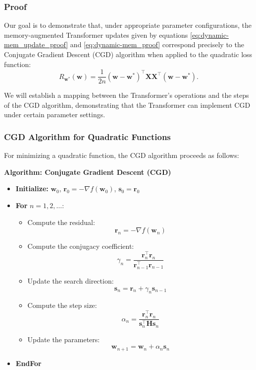 \documentclass[11pt]{article}
\theoremstyle{plain}
\theoremstyle{definition}
\theoremstyle{remark}
\numberwithin{equation}{section}
\begin{document}
\subsubsection*{Proof}
Our goal is to demonstrate that, under appropriate parameter configurations, the memory-augmented Transformer updates given by equations \eqref{eq:dynamic-mem_update_proof} and \eqref{eq:dynamic-mem_proof} correspond precisely to the Conjugate Gradient Descent (CGD) algorithm when applied to the quadratic loss function:
\begin{equation}
    R_{\mathbf{w}^*}(\mathbf{w}) = \frac{1}{2n} (\mathbf{w} - \mathbf{w}^*)^\top \mathbf{X} \mathbf{X}^\top (\mathbf{w} - \mathbf{w}^*). \label{eq:quadratic_loss}
\end{equation}

We will establish a mapping between the Transformer's operations and the steps of the CGD algorithm, demonstrating that the Transformer can implement CGD under certain parameter settings.

\subsubsection*{CGD Algorithm for Quadratic Functions}
For minimizing a quadratic function, the CGD algorithm proceeds as follows:

\begin{mdframed}[roundcorner=5pt, backgroundcolor=gray!10] %
\textbf{Algorithm: Conjugate Gradient Descent (CGD)}
\begin{itemize}
    \item \textbf{Initialize:} \( \mathbf{w}_0 \), \( \mathbf{r}_0 = -\nabla f(\mathbf{w}_0) \), \( \mathbf{s}_0 = \mathbf{r}_0 \)
    \item \textbf{For} \( n = 1, 2, \dots \):
    \begin{itemize}
        \item Compute the residual: 
        \[
        \mathbf{r}_n = -\nabla f(\mathbf{w}_n)
        \]
        \item Compute the conjugacy coefficient:
        \[
        \gamma_n = \frac{\mathbf{r}_n^\top \mathbf{r}_n}{\mathbf{r}_{n-1}^\top \mathbf{r}_{n-1}}
        \]
        \item Update the search direction:
        \[
        \mathbf{s}_n = \mathbf{r}_n + \gamma_n \mathbf{s}_{n-1}
        \]
        \item Compute the step size:
        \[
        \alpha_n = \frac{\mathbf{r}_n^\top \mathbf{r}_n}{\mathbf{s}_n^\top \mathbf{H} \mathbf{s}_n}
        \]
        \item Update the parameters:
        \[
        \mathbf{w}_{n+1} = \mathbf{w}_n + \alpha_n \mathbf{s}_n
        \]
    \end{itemize}
    \item \textbf{EndFor}
\end{itemize}
\end{mdframed}
\end{document}
